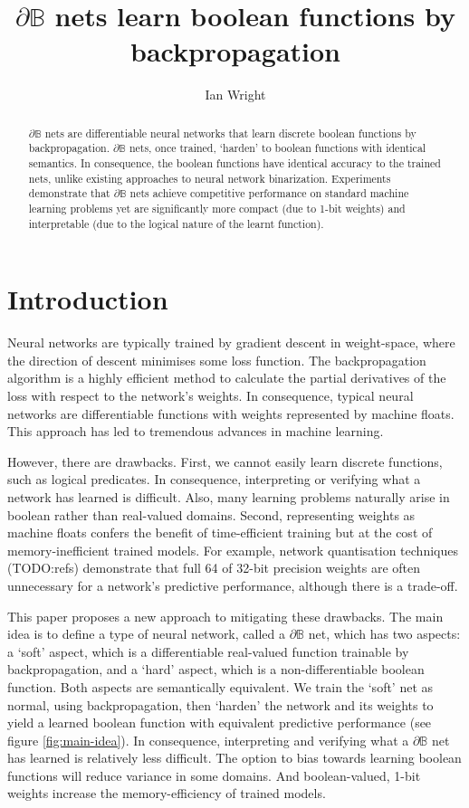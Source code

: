 \documentclass{article} %
\title{$\partial\mathbb{B}$ nets learn boolean functions by\\backpropagation}
\author{Ian Wright}
\begin{document}
\maketitle

\begin{abstract}
	$\partial\mathbb{B}$ nets are differentiable neural networks 
	that learn discrete boolean functions by backpropagation.
	$\partial\mathbb{B}$ nets, once trained, `harden' to boolean functions with identical semantics. In consequence, the boolean functions have identical accuracy to the trained nets, unlike existing approaches to neural network binarization. Experiments demonstrate that $\partial\mathbb{B}$ nets achieve competitive performance on standard machine learning problems yet are significantly more compact (due to 1-bit weights) and interpretable (due to the logical nature of the learnt function).
\end{abstract}

\section{Introduction}

Neural networks are typically trained by gradient descent in weight-space, where the direction of descent minimises some loss function. The backpropagation algorithm \citep{rumelhart1986learning} is a highly efficient method to calculate the partial derivatives of the loss with respect to the network's weights. In consequence, typical neural networks are differentiable functions with weights represented by machine floats. This approach has led to tremendous advances in machine learning.

However, there are drawbacks. First, we cannot easily learn discrete functions, such as logical predicates. In consequence, interpreting or verifying what a network has learned is difficult. Also, many learning problems naturally arise in boolean rather than real-valued domains. Second, representing weights as machine floats confers the benefit of time-efficient training but at the cost of memory-inefficient trained models. For example, network quantisation techniques (TODO:refs) demonstrate that full 64 of 32-bit precision weights are often unnecessary for a network's predictive performance, although there is a trade-off.

This paper proposes a new approach to mitigating these drawbacks. The main idea is to define a type of neural network, called a $\partial \mathbb{B}$ net, which has two aspects: a `soft' aspect, which is a differentiable real-valued function trainable by backpropagation, and a `hard' aspect, which is a non-differentiable boolean function. Both aspects are semantically equivalent. We train the `soft' net as normal, using backpropagation, then `harden' the network and its weights to yield a learned boolean function with equivalent predictive performance (see figure \ref{fig:main-idea}). In consequence, interpreting and verifying what a $\partial \mathbb{B}$ net has learned is relatively less difficult. The option to bias towards learning boolean functions will reduce variance in some domains. And boolean-valued, 1-bit weights increase the memory-efficiency of trained models.
\end{document}
